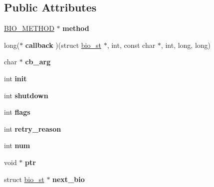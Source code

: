 \subsection*{Public Attributes}
\begin{DoxyCompactItemize}
\item 
\mbox{\label{structbio__st_ac4bef031359b51902ddfb2a7aeaa4dd7}} 
\hyperlink{structbio__method__st}{B\+I\+O\+\_\+\+M\+E\+T\+H\+OD} $\ast$ {\bfseries method}
\item 
\mbox{\label{structbio__st_a6449aab690198cbecb3bc45d9cbf59ac}} 
long($\ast$ {\bfseries callback} )(struct \hyperlink{structbio__st}{bio\+\_\+st} $\ast$, int, const char $\ast$, int, long, long)
\item 
\mbox{\label{structbio__st_a50cdd0a5e46c7253bc6ab1cb37abeaca}} 
char $\ast$ {\bfseries cb\+\_\+arg}
\item 
\mbox{\label{structbio__st_a365cca316f1daf354096eec7dbf98102}} 
int {\bfseries init}
\item 
\mbox{\label{structbio__st_adafdb3d0f58c31b776525ddceec5068b}} 
int {\bfseries shutdown}
\item 
\mbox{\label{structbio__st_aa815fc844603d4a3fcf7abebfeb3f546}} 
int {\bfseries flags}
\item 
\mbox{\label{structbio__st_a4c3a2c24d7c41e8887762750b213e9f0}} 
int {\bfseries retry\+\_\+reason}
\item 
\mbox{\label{structbio__st_a3b769c998195a0f139bc68e1a36aaf09}} 
int {\bfseries num}
\item 
\mbox{\label{structbio__st_ad59e7884d7949dd931c76ac0d84c2ea5}} 
void $\ast$ {\bfseries ptr}
\item 
\mbox{\label{structbio__st_adf41b29002a5236e8112253dd9d8acbf}} 
struct \hyperlink{structbio__st}{bio\+\_\+st} $\ast$ {\bfseries next\+\_\+bio}
\item 
\mbox{\label{structbio__st_a86fd505e8e4af7bb98312d707ee9d170}} 

\end{DoxyCompactItemize}
